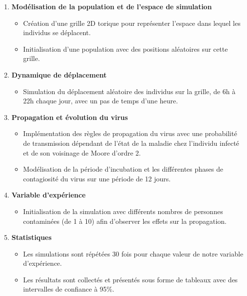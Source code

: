 \documentclass[12pt,french,titlepage]{article}
\begin{document}
\begin{enumerate}

\item \textbf{Modélisation de la population et de l'espace de simulation}
\begin{itemize}
\item Création d'une grille 2D torique pour représenter l'espace dans lequel les individus se déplacent.
\item Initialisation d'une population avec des positions aléatoires sur cette grille.
\end{itemize}

\item \textbf{Dynamique de déplacement}
\begin{itemize}
\item Simulation du déplacement aléatoire des individus sur la grille, de 6h à 22h chaque jour, avec un pas de temps d'une heure.
\end{itemize}

\item \textbf{Propagation et évolution du virus}
\begin{itemize}
\item Implémentation des règles de propagation du virus avec une probabilité de transmission dépendant de l'état de la maladie chez l'individu infecté et de son voisinage de Moore d'ordre 2.
\item Modélisation de la période d'incubation et les différentes phases de contagiosité du virus sur une période de 12 jours.
\end{itemize}

\item \textbf{Variable d'expérience}
\begin{itemize}
\item Initialisation de la simulation avec différents nombres de personnes contaminées (de 1 à 10) afin d'observer les effets sur la propagation.
\end{itemize}

\item \textbf{Statistiques}
\begin{itemize}
\item Les simulations sont répétées 30 fois pour chaque valeur de notre variable d'expérience.
\item Les résultats sont collectés et présentés sous forme de tableaux avec des intervalles de confiance à 95\%.
\end{itemize}

\end{enumerate}
 
\end{document}
